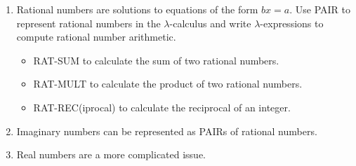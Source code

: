 \documentclass[11pt]{report}
\begin{document}
\begin{enumerate}
	{\bf Example} The equation $x + 1 = 0$ has solution $x = -1$. One way to represent this in the $\lambda$-calculus is to use the pair $(0,1)$ which we interpret as $-1 = (0,1)$. 
	
	More generally $k = (a,b) = a - b$ represents the solution to $x + b = a$.

	\hspace{0.5cm} {\bf Such representations are not unique!} e.g. $0 = (0,0) = (1,1) = \dots$

	Write $\lambda$-expressions for arithmetic on integers as pairs of Church numerals.
		\begin{itemize}
			\item[] INT-SUM to calculate the sum of two integers.
			\item[] INT-MULT to calculate the product of two integers.
			\item[] INT-NEG(ative) to calculate the negative of an integer.
		\end{itemize}

	\item Rational numbers are solutions to equations of the form $bx = a$. Use PAIR to represent rational numbers in the $\lambda$-calculus and write $\lambda$-expressions to compute rational number arithmetic. 
		\begin{itemize}
			\item[] RAT-SUM to calculate the sum of two rational numbers.
			\item[] RAT-MULT to calculate the product of two rational numbers.
			\item[] RAT-REC(iprocal) to calculate the reciprocal of an integer.
		\end{itemize}

	\item Imaginary numbers can be represented as PAIRs of rational numbers.
	
	\item Real numbers are a more complicated issue.

\end{enumerate}
	
\end{document}
